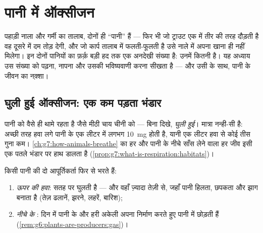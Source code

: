 \chapter{पानी में ऑक्सीजन}\label{ch:g7:oxygen-in-the-water}

पहाड़ी नाला और गर्मी का तालाब, दोनों ही ``पानी'' हैं --- फिर भी जो
ट्राउट एक में तीर की तरह दौड़ती है वह दूसरे में दम तोड़ देगी, और जो
कार्प तालाब में फलती-फूलती है उसे नाले में अपना खाना ही नहीं मिलेगा।
इन दोनों पानियों का फ़र्क़ बड़ी हद तक एक अनदेखी संख्या है: उनमें कितनी
  है। यह अध्याय उस संख्या को पढ़ना, नापना और उसकी
भविष्यवाणी करना सीखता है --- और उसी के साथ, पानी के जीवन का नक़्शा।

\section{घुली हुई ऑक्सीजन: एक कम पड़ता भंडार}

\begin{definition}[घुली हुई ऑक्सीजन]\label{def:g7:oxygen-in-the-water:dissolved}
पानी  को वैसे ही थामे रहता है जैसे मीठी चाय चीनी को --- बिना
दिखे, \emph{घुली हुई}। मात्रा नन्ही-सी है:
अच्छी तरह हवा लगे पानी के एक लीटर में लगभग \qty{10}{mg}  होती
है, यानी एक लीटर हवा से कोई तीस गुना कम। \cref{ch:g7:how-animals-breathe}
का हर  और पानी के नीचे साँस लेने वाला हर जीव इसी एक पतले भंडार पर
हाथ डालता है (\cref{prop:g7:what-is-respiration:habitats})।
\end{definition}

\begin{proposition}[भंडार कौन भरता है]\label{prop:g7:oxygen-in-the-water:fills}
किसी पानी की  दो आपूर्तिकर्ता फिर से भरते हैं:
\begin{enumerate}
  \item \emph{ऊपर की हवा}:  सतह पर घुलती है --- और वहाँ ज़्यादा
        तेज़ी से, जहाँ पानी हिलता, छपकता और झाग बनाता है (तेज़ ढलानें,
        झरने, लहरें, बारिश);
  \item \emph{नीचे के }: दिन में पानी के  और हरी अकेली
         अपना निर्माण करते हुए पानी में  छोड़ती हैं
        (\cref{rem:g6:plants-are-producers:gas})।
\end{enumerate}
\end{proposition}
\admitted

